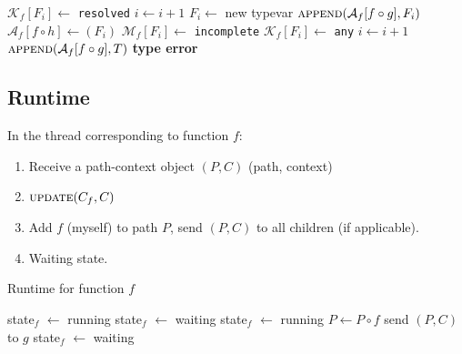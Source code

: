 \documentclass[10pt]{article}
\begin{document}
\begin{algorithm}
\begin{algorithmic}[1]
						\State $\mathcal{K}_f[F_i] \gets $ \texttt{resolved}
						\State $i \gets i+1$
						\State $F_i \gets $ new typevar
						\State $\Call{append}{\mathcal{A}_f[f \circ g], F_i}$
						\State $\mathcal{A}_f[f \circ h] \gets (F_i)$
						\State $\mathcal{M}_f[F_i] \gets $ \texttt{incomplete}
						\State $\mathcal{K}_f[F_i] \gets $ \texttt{any}
						\State $i \gets i+1$
							\State $\Call{append}{\mathcal{A}_f[f \circ g], T}$
						\Else
							\State \Return \textbf{type error}
						\EndIf
					\EndIf
				\EndFor
			\EndFor
		\EndFunction
	\end{algorithmic}
\end{algorithm}

\subsection{Runtime}

In the thread corresponding to function $f$:

\begin{enumerate}[noitemsep]
	\item  Receive a path-context object $(P, C)$ (path, context)


	\item $\Call{update}{C_f, C}$

	\item Add $f$ (myself) to path $P$, send $(P, C)$ to all children (if
		applicable).

	\item Waiting state.
\end{enumerate}

\begin{algorithm}
	\caption{Runtime for function $f$}
	\begin{algorithmic}[1]
		\Statex
		\State state$_f$ $\gets$ running
		\State {}
		\State state$_f$ $\gets$ waiting
			\State state$_f$ $\gets$ running 
			\State {}
			\State $P \gets P \circ f$ 
				\State send $(P, C)$ to $g$
			\EndFor
			\State state$_f$ $\gets$ waiting 
		\EndWhile
			\State {}
		\EndIf
		\EndFunction
	\end{algorithmic}
\end{algorithm}
\end{document}
